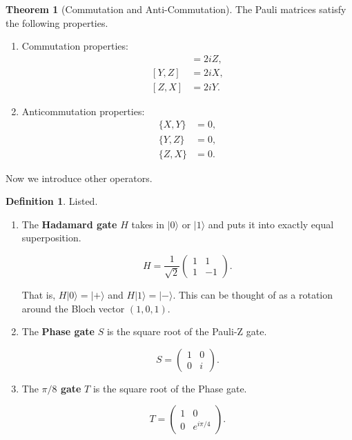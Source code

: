 \documentclass{article}
\theoremstyle{definition}
\newtheorem{theorem}{Theorem}[section]
\newtheorem{definition}{Definition}[section]
\begin{document}
    \begin{theorem}[Commutation and Anti-Commutation]
      The Pauli matrices satisfy the following properties. 
      \begin{enumerate}
        \item Commutation properties: 
          \begin{align} 
            [X, Y] & = 2iZ, \\
            [Y, Z] & = 2iX, \\
            [Z, X] & = 2iY.
          \end{align}

        \item Anticommutation properties: 
          \begin{align} 
            \{X, Y\} & = 0, \\
            \{Y, Z\} & = 0, \\
            \{Z, X\} & = 0.
          \end{align}
      \end{enumerate}
    \end{theorem}

    Now we introduce other operators. 

    \begin{definition}
      Listed. 

      \begin{enumerate}
        \item The \textbf{Hadamard gate} $H$ takes in $|0\rangle$ or $|1\rangle$ and puts it into exactly equal superposition.

          \[H = \frac{1}{\sqrt{2}} \begin{pmatrix} 1 & 1 \\ 1 & -1 \end{pmatrix}.\]

        That is, $H|0\rangle = |+\rangle$ and $H|1\rangle = |-\rangle$. This can be thought of as a rotation around the Bloch vector $(1, 0, 1)$.

        \item The \textbf{Phase gate} $S$ is the square root of the Pauli-Z gate.

          \[S = \begin{pmatrix} 1 & 0 \\ 0 & i \end{pmatrix}.\]

        \item The \textbf{$\pi/8$ gate} $T$ is the square root of the Phase gate.

          \[T = \begin{pmatrix} 1 & 0 \\ 0 & e^{i \pi/4} \end{pmatrix}.\]
      \end{enumerate} 
    \end{definition}
\end{document}
